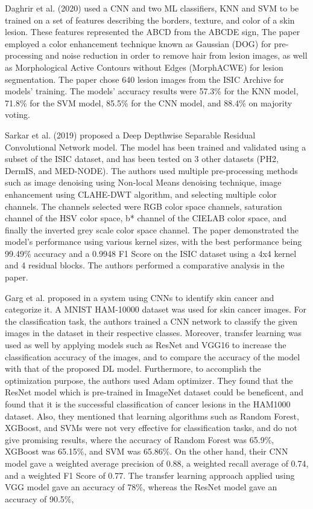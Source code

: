 \documentclass[12pt]{diazessay}
\begin{document}
    Daghrir et al. \cite{Daghrir2020-yt} (2020) used a CNN and two ML classifiers, KNN and SVM to be trained on a set of features describing the borders, texture, and color of a skin lesion. These features represented the ABCD from the ABCDE sign, The paper employed a color enhancement technique known as Gaussian (DOG) for pre-processing and noise reduction in order to remove hair from lesion images, as well as Morphological Active Contours without Edges (MorphACWE) for lesion segmentation. The paper chose 640 lesion images from the ISIC Archive for models' training. The models' accuracy results were 57.3\% for the KNN model, 71.8\% for the SVM model, 85.5\% for the CNN model, and 88.4\% on majority voting.
    
    Sarkar et al. \cite{Sarkar2019-ew} (2019) proposed a Deep Depthwise Separable Residual Convolutional Network model. The model has been trained and validated using a subset of the ISIC dataset, and has been tested on 3 other datasets (PH2, DermIS, and MED-NODE). The authors used multiple pre-processing methods such as image denoising using Non-local Means denoising technique, image enhancement using CLAHE-DWT algorithm, and selecting multiple color channels. The channels selected were RGB color space channels, saturation channel of the HSV color space, b* channel of the CIELAB color space, and finally the inverted grey scale color space channel. The paper demonstrated the model's performance using various kernel sizes, with the best performance being 99.49\% accuracy and a 0.9948 F1 Score on the ISIC dataset using a 4x4 kernel and 4 residual blocks. The authors performed a comparative analysis in the paper.

    
    Garg et al. proposed in \cite{Garg2019-pf} a system using CNNs to identify skin cancer and categorize it. A MNIST HAM-10000 dataset was used for skin cancer images. For the classification task, the authors trained a CNN network to classify the given images in the dataset in their respective classes. Moreover, transfer learning was used as well by applying models such as ResNet and VGG16 to increase the classification accuracy of the images, and to compare the accuracy of the model with that of the proposed DL model. Furthermore, to accomplish the optimization purpose, the authors used Adam optimizer. They found that the ResNet model which is pre-trained in ImageNet dataset could be beneficent, and found that it is the successful classification of cancer lesions in the HAM1000 dataset. Also, they mentioned that learning algorithms such as Random Forest, XGBoost, and SVMs were not very effective for classification tasks, and do not give promising results, where the accuracy of Random Forest was 65.9\%, XGBoost was 65.15\%, and SVM was 65.86\%. On the other hand, their CNN model gave a weighted average precision of 0.88, a weighted recall average of 0.74, and a weighted F1 Score of 0.77. The transfer learning approach applied using VGG model gave an accuracy of 78\%, whereas the ResNet model gave an accuracy of 90.5\%,
    
\end{document}
